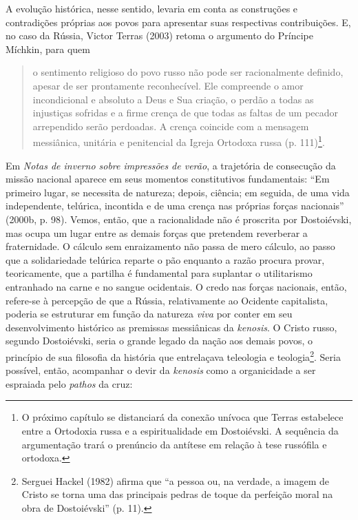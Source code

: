 A evolução histórica, nesse sentido, levaria em conta as construções e
contradições próprias aos povos para apresentar suas respectivas
contribuições. E, no caso da Rússia, Victor Terras (2003) retoma o
argumento do Príncipe Míchkin, para quem

\begin{quote}
o sentimento religioso do povo russo não pode ser racionalmente
definido, apesar de ser prontamente reconhecível. Ele compreende o amor
incondicional e absoluto a Deus e Sua criação, o perdão a todas as
injustiças sofridas e a firme crença de que todas as faltas de um
pecador arrependido serão perdoadas. A crença coincide com a mensagem
messiânica, unitária e penitencial da Igreja Ortodoxa russa (p.
111)\footnote{O próximo capítulo se distanciará da conexão unívoca que
  Terras estabelece entre a Ortodoxia russa e a espiritualidade em
  Dostoiévski. A sequência da argumentação trará o prenúncio da antítese
  em relação à tese russófila e ortodoxa.}.
\end{quote}

Em \emph{Notas de inverno sobre impressões de verão}, a trajetória de
consecução da missão nacional aparece em seus momentos constitutivos
fundamentais: ``Em primeiro lugar, se necessita de natureza; depois,
ciência; em seguida, de uma vida independente, telúrica, incontida e de
uma crença nas próprias forças nacionais'' (2000b, p. 98). Vemos, então,
que a racionalidade não é proscrita por Dostoiévski, mas ocupa um lugar
entre as demais forças que pretendem reverberar a fraternidade. O
cálculo sem enraizamento não passa de mero cálculo, ao passo que a
solidariedade telúrica reparte o pão enquanto a razão procura provar,
teoricamente, que a partilha é fundamental para suplantar o utilitarismo
entranhado na carne e no sangue ocidentais. O credo nas forças
nacionais, então, refere-se à percepção de que a Rússia, relativamente
ao Ocidente capitalista, poderia se estruturar em função da natureza
\emph{viva} por conter em seu desenvolvimento histórico as premissas
messiânicas da \emph{kenosis}. O Cristo russo, segundo Dostoiévski,
seria o grande legado da nação aos demais povos, o princípio de sua
filosofia da história que entrelaçava teleologia e teologia\footnote{Serguei
  Hackel (1982) afirma que ``a pessoa ou, na verdade, a imagem de Cristo
  se torna uma das principais pedras de toque da perfeição moral na obra
  de Dostoiévski'' (p. 11).}. Seria possível, então, acompanhar o devir
da \emph{kenosis} como a organicidade a ser espraiada pelo \emph{pathos}
da cruz:

